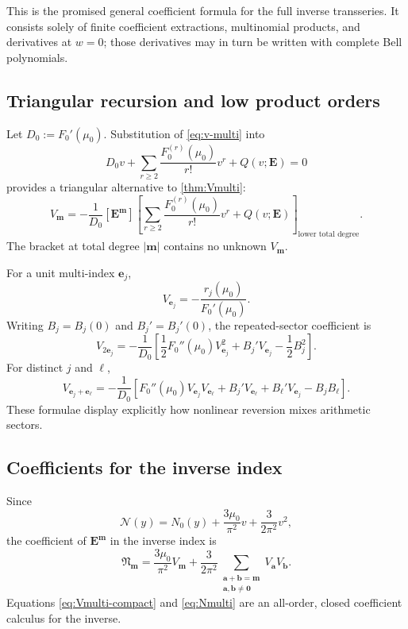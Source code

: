 \documentclass[11pt,a4paper]{article}
\numberwithin{equation}{section}
\theoremstyle{definition}
\theoremstyle{remark}
\newcommand{\Ncal}{\mathcal N}
\newcommand{\multi}[1]{\boldsymbol{#1}}
\newcommand{\abs}[1]{\lvert#1\rvert}
\begin{document}
This is the promised general coefficient formula for the full inverse
transseries.  It consists solely of finite coefficient extractions,
multinomial products, and derivatives at $w=0$; those derivatives may in turn
be written with complete Bell polynomials.

\subsection{Triangular recursion and low product orders}

Let $D_0:=F_0'(\mu_0)$.  Substitution of \eqref{eq:v-multi} into
\begin{equation}\label{eq:v-equation-expanded}
 D_0v+\sum_{r\geq2}\frac{F_0^{(r)}(\mu_0)}{r!}v^r
 +Q(v;\multi E)=0
\end{equation}
provides a triangular alternative to \cref{thm:Vmulti}:
\begin{equation}\label{eq:V-recursion}
 \boxed{
 V_{\multi m}=-\frac1{D_0}[\multi E^{\multi m}]
 \left[
 \sum_{r\geq2}\frac{F_0^{(r)}(\mu_0)}{r!}v^r
 +Q(v;\multi E)
 \right]_{\text{lower total degree}}.}
\end{equation}
The bracket at total degree $\abs{\multi m}$ contains no unknown
$V_{\multi m}$.

For a unit multi-index $\multi e_j$,
\begin{equation}\label{eq:V1}
 \boxed{
 V_{\multi e_j}=-\frac{r_j(\mu_0)}{F_0'(\mu_0)}.}
\end{equation}
Writing $B_j=B_j(0)$ and $B_j'=B_j'(0)$, the repeated-sector coefficient is
\begin{equation}\label{eq:V2same}
 V_{2\multi e_j}=-\frac1{D_0}
 \left[
 \frac12F_0''(\mu_0)V_{\multi e_j}^2
 +B_j'V_{\multi e_j}-\frac12B_j^2
 \right].
\end{equation}
For distinct $j$ and $\ell$,
\begin{equation}\label{eq:V2cross}
 V_{\multi e_j+\multi e_\ell}=-\frac1{D_0}
 \left[
 F_0''(\mu_0)V_{\multi e_j}V_{\multi e_\ell}
 +B_j'V_{\multi e_\ell}+B_\ell'V_{\multi e_j}-B_jB_\ell
 \right].
\end{equation}
These formulae display explicitly how nonlinear reversion mixes arithmetic
sectors.

\subsection{Coefficients for the inverse index}

Since
\begin{equation}\label{eq:N-v}
 \Ncal(y)=N_0(y)+\frac{3\mu_0}{\pi^2}v
 +\frac{3}{2\pi^2}v^2,
\end{equation}
the coefficient of $\multi E^{\multi m}$ in the inverse index is
\begin{equation}\label{eq:Nmulti}
 \boxed{
 \mathfrak N_{\multi m}=
 \frac{3\mu_0}{\pi^2}V_{\multi m}
 +\frac{3}{2\pi^2}
 \sum_{\substack{\multi a+\multi b=\multi m\\
                  \multi a,\multi b\neq\multi0}}
 V_{\multi a}V_{\multi b}.}
\end{equation}
Equations \eqref{eq:Vmulti-compact} and \eqref{eq:Nmulti} are an all-order,
closed coefficient calculus for the inverse.
\end{document}
